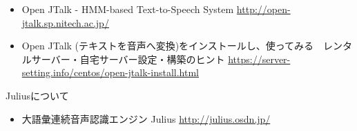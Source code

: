 \documentclass[a4paper,dvipdfmx]{jarticle}
\newcommand\liststyleLxix{%
\renewcommand\labelitemi{{\textbullet}}
\renewcommand\labelitemii{${\circ}$}
\renewcommand\labelitemiii{${\blacksquare}$}
\renewcommand\labelitemiv{{\textbullet}}
}
\newcommand\liststyleLxx{%
\renewcommand\labelitemi{{\textbullet}}
\renewcommand\labelitemii{${\circ}$}
\renewcommand\labelitemiii{${\blacksquare}$}
\renewcommand\labelitemiv{{\textbullet}}
}
\begin{document}
\liststyleLxix
\begin{itemize}
\item {
Open JTalk - HMM-based Text-to-Speech System\newline
\href{http://open-jtalk.sp.nitech.ac.jp/}{http://open-}\href{http://open-jtalk.sp.nitech.ac.jp/}{jtalk.sp.nitech.ac.jp/}}
\item {
Open JTalk
(テキストを音声へ変換)をインストールし、使ってみる~{\textbar}~レンタルサーバー・自宅サーバー設定・構築のヒント\newline
\url{https://server-setting.info/centos/open-jtalk-install.html}}
\end{itemize}
{
Juliusについて}

\liststyleLxx
\begin{itemize}
\item {
大語彙連続音声認識エンジン Julius\newline
\url{http://julius.osdn.jp/}}
\end{itemize}
\end{document}
